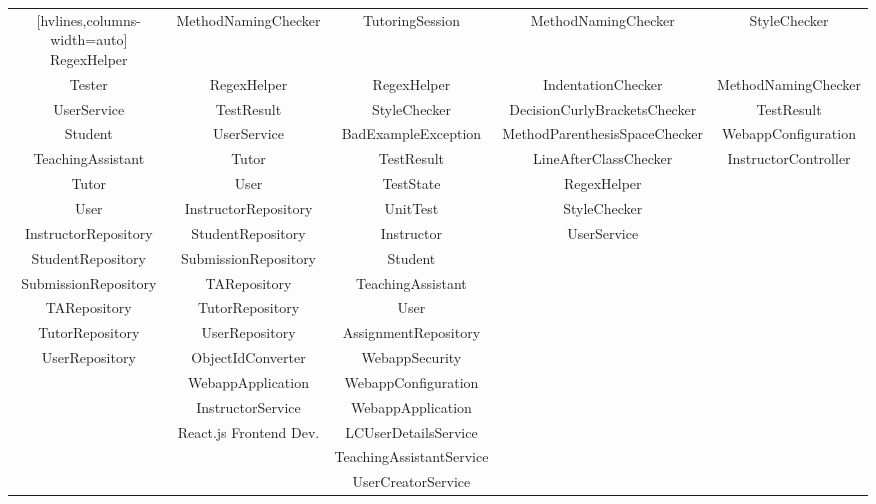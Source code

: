 \documentclass[a4paper, 12pt]{article}
\begin{document}
\begin{table}[ht]
{\begin{NiceTabular}{ccccc}[hvlines,columns-width=auto]
            RegexHelper & MethodNamingChecker & TutoringSession & MethodNamingChecker & StyleChecker \\

            Tester & RegexHelper & RegexHelper & IndentationChecker & MethodNamingChecker \\

            UserService & TestResult & StyleChecker & DecisionCurlyBracketsChecker & TestResult \\

            Student & UserService & BadExampleException & MethodParenthesisSpaceChecker & WebappConfiguration \\

            TeachingAssistant & Tutor & TestResult & LineAfterClassChecker & InstructorController \\

            Tutor & User & TestState & RegexHelper &  \\

            User & InstructorRepository & UnitTest & StyleChecker &  \\

            InstructorRepository & StudentRepository & Instructor & UserService &  \\

            StudentRepository & SubmissionRepository & Student &  &  \\

            SubmissionRepository & TARepository & TeachingAssistant &  &  \\

            TARepository & TutorRepository & User &  &  \\

            TutorRepository & UserRepository & AssignmentRepository &  &  \\

            UserRepository & ObjectIdConverter & WebappSecurity &  &  \\

             & WebappApplication & WebappConfiguration &  &  \\

             & InstructorService & WebappApplication &  &  \\

             & React.js Frontend Dev. & LCUserDetailsService &  &  \\

             &  & TeachingAssistantService &  &  \\

             &  & UserCreatorService &  &  \\

            \end{NiceTabular} }

    \end{table}
\end{document}

